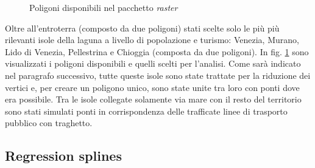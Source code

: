 \documentclass[a4paper,11pt,twoside,openright]{book}							%
\begin{document}
\begin{figure}[t]
	\centering
	\caption{Poligoni disponibili nel pacchetto \textit{raster}}
	\label{fig:Ven_poligoni}
\end{figure}

Oltre all'entroterra (composto da due poligoni) stati scelte solo le più più rilevanti isole della laguna a livello di popolazione e turismo: Venezia, Murano, Lido di Venezia, Pellestrina e Chioggia (composta da due poligoni). In fig. \ref{fig:Ven_poligoni} sono visualizzati i poligoni disponibili e quelli scelti per l'analisi. Come sarà indicato nel paragrafo successivo, tutte queste isole sono state trattate per la riduzione dei vertici e, per creare un poligono unico, sono state unite tra loro con ponti dove era possibile. Tra le isole collegate solamente via mare con il resto del territorio sono stati simulati ponti in corrispondenza delle trafficate linee di trasporto pubblico con traghetto. 

\subsection{Regression splines}
\end{document}
